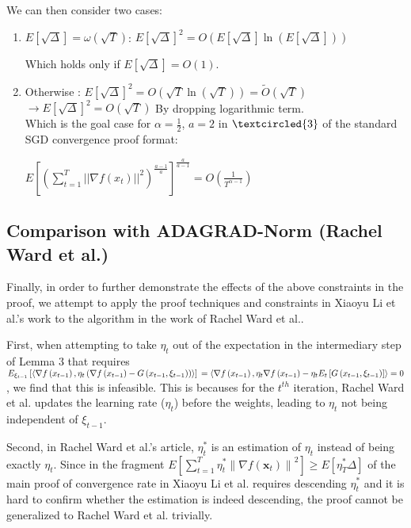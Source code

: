 \documentclass[14pt,onecolumn,letterpaper]{extarticle}
\begin{document}
We can then consider two cases:
    \begin{enumerate}
        \item$E\left[\sqrt{\Delta}\right] = \omega \left(\sqrt{T}\right)$: 
        $E\left[\sqrt{\Delta}\right]^{2} = O\left(E\left[\sqrt{\Delta}\right]\ln\left(E\left[\sqrt{\Delta}\right]\right)\right)$ \\ 
        \par\vspace{3mm}
        Which holds only if $E\left[\sqrt{\Delta}\right] = O\left(1\right)$.
        \item Otherwise : $E\left[\sqrt{\Delta}\right]^2 = O\left(\sqrt{T}\ln\left(\sqrt{T}\right)\right)=\tilde{O}\left(\sqrt{T}\right)$\\
        $\rightarrow  E\left[\sqrt{\Delta}\right]^2=O\left(\sqrt{T}\right)$ By
        dropping logarithmic term.
        \\Which is the goal case for $\alpha = \frac{1}{2}$, $a = 2$ in $\textcircled{3}$ of the standard SGD convergence proof format:
        \par\vspace{3mm}
        $E\left[(\sum_{t=1}^{T}||\nabla f(x_t)||^2)^\frac{a-1}{a}\right]^{\frac{a}{a-1}} = O(\frac{1}{T^{\alpha - 1}})$
    \end{enumerate}

\subsection{Comparison with ADAGRAD-Norm (Rachel Ward et al.)}
Finally, in order to further demonstrate the effects of the above constraints in the proof, we attempt to apply the proof techniques and constraints in Xiaoyu Li et al.'s work to the algorithm in the work of Rachel Ward et al.. \par
First, when attempting to take $\eta_t$ out of the expectation in the intermediary step of Lemma 3 that requires $E_{\xi_{t-1}}\left[\left\langle\nabla f\left(x_{t-1}\right), \eta_t\left(\nabla f\left(x_{t-1}\right)-G\left(x_{t-1}, \xi_{t-1}\right)\right)\right\rangle\right]\\=\left\langle\nabla f\left(x_{t-1}\right), \eta_t \nabla f\left(x_{t-1}\right)-\eta_t E_t\left[G\left(x_{t-1}, \xi_{t-1}\right)\right]\right\rangle=0$, we find that this is infeasible. This is becauses for the $t^{th}$ iteration, Rachel Ward et al. updates the learning rate ($\eta_t$) before the weights, leading to $\eta_t$ not being independent of $\xi_{t-1}$.\par
Second, in Rachel Ward et al.'s article, $\eta_t^*$ is an estimation of $\eta_t$ instead of being exactly $\eta_t$. Since in the fragment $E\left[\sum_{t=1}^T \eta_t^*\left\|\nabla f\left(\boldsymbol{x}_t\right)\right\|^2\right] \geq E\left[\eta_T^* \Delta\right]$ of the main proof of convergence rate in Xiaoyu Li et al. requires descending $\eta_t^*$ and it is hard to confirm whether the estimation is indeed descending, the proof cannot be generalized to Rachel Ward et al. trivially.
\end{document}
